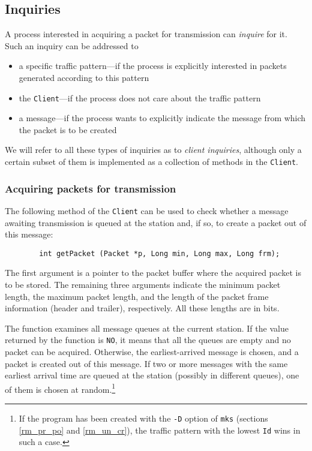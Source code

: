\subsection{Inquiries}
\label{rm_cl_in}

A process interested in acquiring a packet for transmission can {\em inquire\/}
for it.
Such an inquiry can be addressed to
\begin{itemize}
\item
a specific traffic pattern---if the process
is explicitly interested in packets generated according to this pattern
\item
the {\tt Client}---if the process does not care about the traffic
pattern
\item
a message---if the process wants to explicitly indicate the message from
which the packet is to be created
\end{itemize}
\noindent
We will refer to all these types of inquiries as to {\em client inquiries},
although only a certain subset of them is implemented as a collection of
methods in the {\tt Client}.

\subsubsection{Acquiring packets for transmission}
\label{rm_cl_in_ap}

The following method of the {\tt Client} can be used to check whether a
message awaiting transmission is queued at the station and, if so, to 
create a packet out of this message:
\begin{verbatim}
        int getPacket (Packet *p, Long min, Long max, Long frm);
\end{verbatim}

\noindent
The first argument is a pointer to the packet buffer where
the acquired packet is to be stored.
The remaining three arguments indicate the minimum packet length,
the maximum packet length, and the length of the packet frame information
(header and trailer), respectively.
All these lengths are in bits.

The function examines all message queues at the current station.
If the value returned by the function is {\tt NO},
it means that all the queues are empty and no packet can be acquired.
Otherwise, the earliest-arrived message is chosen, and a packet is created
out of this message.
If two or more messages with the same earliest arrival time are queued at
the station (possibly in different queues),
one of them is chosen at random.\footnote{If the program has been created
with the {\tt -D} option of {\tt mks} (sections \ref{rm_pr_po}
and \ref{rm_un_cr}), the traffic pattern with the lowest {\tt Id} wins in
such a case.}

